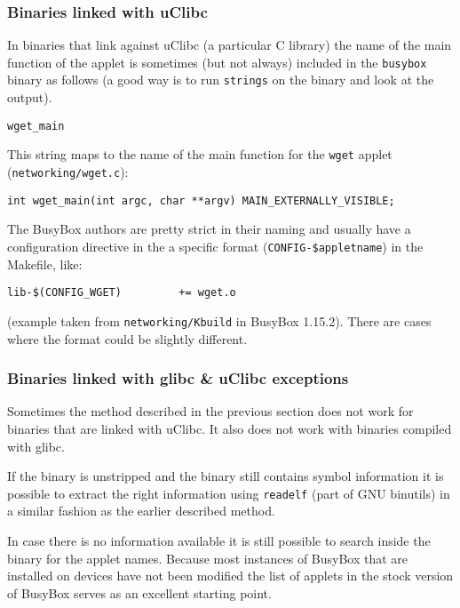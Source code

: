 \documentclass[10pt]{article}
\begin{document}
\subsubsection{Binaries linked with uClibc}

In binaries that link against uClibc (a particular C library) the name of the
main function of the applet is sometimes (but not always) included in the
\texttt{busybox} binary as follows (a good way is to run \texttt{strings} on
the binary and look at the output).

\begin{verbatim}
wget_main
\end{verbatim}

This string maps to the name of the main function for the \texttt{wget} applet
(\texttt{networking/wget.c}):

\begin{verbatim}
int wget_main(int argc, char **argv) MAIN_EXTERNALLY_VISIBLE;
\end{verbatim}

The BusyBox authors are pretty strict in their naming and usually have a
configuration directive in the a specific format
(\texttt{CONFIG-\$appletname}) in the Makefile, like:

\begin{verbatim}
lib-$(CONFIG_WGET)         += wget.o
\end{verbatim}

(example taken from \texttt{networking/Kbuild} in BusyBox 1.15.2). There are
cases where the format could be slightly different.

\subsubsection{Binaries linked with glibc \& uClibc exceptions}

Sometimes the method described in the previous section does not work for
binaries that are linked with uClibc. It also does not work with binaries
compiled with glibc.

If the binary is unstripped and the binary still contains symbol information
it is possible to extract the right information using \texttt{readelf} (part
of GNU binutils) in a similar fashion as the earlier described method.

In case there is no information available it is still possible to search inside
the binary for the applet names. Because most instances of BusyBox that are
installed on devices have not been modified the list of applets in the stock
version of BusyBox serves as an excellent starting point.
\end{document}
